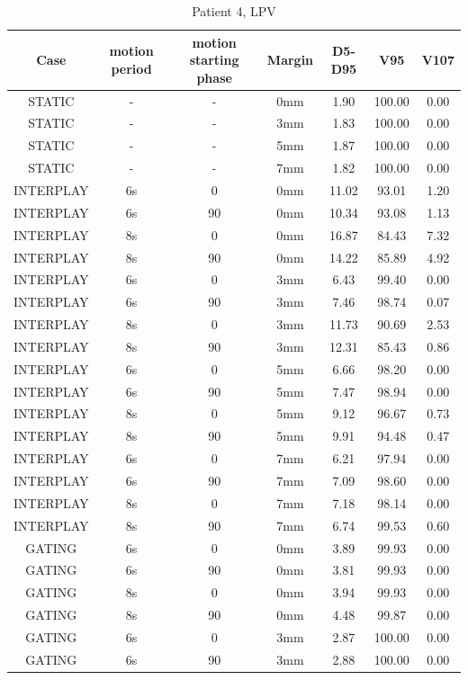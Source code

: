 \documentclass[type=dr, dr=rernat, accentcolor=tud7b,colorbacktitle, bigchapter, openright, twoside, 12pt ]{tudthesis}
\begin{document}
\begin{table}[H]
  \centering
  \caption{Patient 4, LPV}
  \begin{tabular}{|c||c|c|c||c|c|c|}
    \hline\hline
    Case & motion period & motion starting phase & Margin & D5-D95 & V95 & V107\\
    \hline 
STATIC & - & - & 0mm & 1.90 & 100.00 & 0.00 \\
STATIC & - & - & 3mm & 1.83 & 100.00 & 0.00 \\
STATIC & - & - & 5mm & 1.87 & 100.00 & 0.00 \\
STATIC & - & - & 7mm & 1.82 & 100.00 & 0.00 \\
INTERPLAY & 6s & 0 & 0mm & 11.02 & 93.01 & 1.20 \\
INTERPLAY & 6s & 90 & 0mm & 10.34 & 93.08 & 1.13 \\
INTERPLAY & 8s & 0 & 0mm & 16.87 & 84.43 & 7.32 \\
INTERPLAY & 8s & 90 & 0mm & 14.22 & 85.89 & 4.92 \\
INTERPLAY & 6s & 0 & 3mm & 6.43 & 99.40 & 0.00 \\
INTERPLAY & 6s & 90 & 3mm & 7.46 & 98.74 & 0.07 \\
INTERPLAY & 8s & 0 & 3mm & 11.73 & 90.69 & 2.53 \\
INTERPLAY & 8s & 90 & 3mm & 12.31 & 85.43 & 0.86 \\
INTERPLAY & 6s & 0 & 5mm & 6.66 & 98.20 & 0.00 \\
INTERPLAY & 6s & 90 & 5mm & 7.47 & 98.94 & 0.00 \\
INTERPLAY & 8s & 0 & 5mm & 9.12 & 96.67 & 0.73 \\
INTERPLAY & 8s & 90 & 5mm & 9.91 & 94.48 & 0.47 \\
INTERPLAY & 6s & 0 & 7mm & 6.21 & 97.94 & 0.00 \\
INTERPLAY & 6s & 90 & 7mm & 7.09 & 98.60 & 0.00 \\
INTERPLAY & 8s & 0 & 7mm & 7.18 & 98.14 & 0.00 \\
INTERPLAY & 8s & 90 & 7mm & 6.74 & 99.53 & 0.60 \\
GATING & 6s & 0 & 0mm & 3.89 & 99.93 & 0.00 \\
GATING & 6s & 90 & 0mm & 3.81 & 99.93 & 0.00 \\
GATING & 8s & 0 & 0mm & 3.94 & 99.93 & 0.00 \\
GATING & 8s & 90 & 0mm & 4.48 & 99.87 & 0.00 \\
GATING & 6s & 0 & 3mm & 2.87 & 100.00 & 0.00 \\
GATING & 6s & 90 & 3mm & 2.88 & 100.00 & 0.00 \\

\end{tabular}
\end{table}
\end{document}
